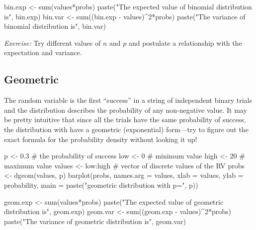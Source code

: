\documentclass[
  letterpaper,
  DIV=11,
  numbers=noendperiod]{scrreprt}
\newenvironment{Shaded}{\begin{snugshade}}{\end{snugshade}}
\newcommand{\NormalTok}[1]{\textcolor[rgb]{0.00,0.23,0.31}{#1}}
\begin{document}
\begin{Shaded}
\begin{Highlighting}[]
\NormalTok{bin.exp \textless{}{-} sum(values*probs)}
\NormalTok{paste("The expected value of binomial distribution is", bin.exp)}
\NormalTok{bin.var \textless{}{-} sum((bin.exp {-} values)\^{}2*probs)}
\NormalTok{paste("The variance of binomial distribution is", bin.var)}
\end{Highlighting}
\end{Shaded}

\emph{Exercise:} Try different values of \(n\) and \(p\) and postulate a
relationship with the expectation and variance.

\subsection{Geometric}\label{geometric}

The random variable is the first ``success'' in a string of independent
binary trials and the distribution describes the probability of any
non-negative value. It may be pretty intuitive that since all the trials
have the same probability of success, the distribution with have a
geometric (exponential) form---try to figure out the exact formula for
the probability density without looking it up!

\begin{Shaded}
\begin{Highlighting}[]
\NormalTok{p \textless{}{-} 0.3 \# the probability of success}
\NormalTok{low \textless{}{-} 0 \# minimum value}
\NormalTok{high \textless{}{-} 20 \# maximum value}
\NormalTok{values \textless{}{-} low:high \# vector of discrete values of the RV}
\NormalTok{probs \textless{}{-} dgeom(values, p)}
\NormalTok{barplot(probs, names.arg = values, xlab = \textquotesingle{}values\textquotesingle{}, ylab = \textquotesingle{}probability\textquotesingle{}, main = paste("geometric distribution with p=", p))}
\end{Highlighting}
\end{Shaded}

\begin{Shaded}
\begin{Highlighting}[]
\NormalTok{geom.exp \textless{}{-} sum(values*probs)}
\NormalTok{paste("The expected value of geometric distribution is", geom.exp)}
\NormalTok{geom.var \textless{}{-} sum((geom.exp {-} values)\^{}2*probs)}
\NormalTok{paste("The variance of geometric distribution is", geom.var)}
\end{Highlighting}
\end{Shaded}
\end{document}
